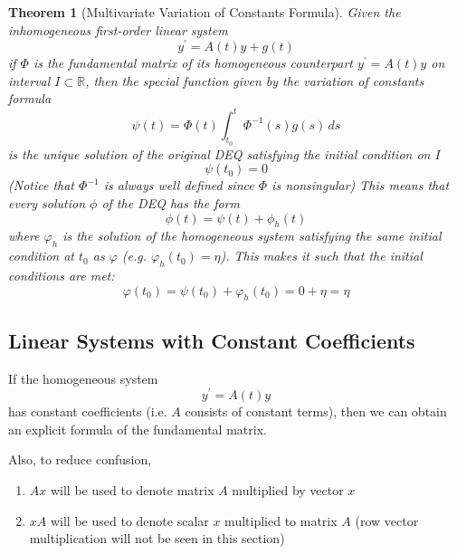 \documentclass{article}
\newtheorem{theorem}{Theorem}[section]
\theoremstyle{remark}
\theoremstyle{definition}
\begin{document}
      \begin{theorem}[Multivariate Variation of Constants Formula]
      Given the inhomogeneous first-order linear system 
      \[y^\prime = A(t) y + g(t)\]
      if $\Phi$ is the fundamental matrix of its homogeneous counterpart $y^\prime = A(t) y$ on interval $I \subset \mathbb{R}$, then the special function given by the variation of constants formula 
      \[\psi (t) = \Phi (t) \int_{t_0}^t \Phi^{-1} (s) g(s) \,ds\]
      is the unique solution of the original DEQ satisfying the initial condition on $I$
      \[\psi (t_0) = 0\]
      (Notice that $\Phi^{-1}$ is always well defined since $\Phi$ is nonsingular) This means that every solution $\phi$ of the DEQ has the form 
      \[\phi(t) = \psi (t) + \phi_h (t)\]
      where $\varphi_h$ is the solution of the homogeneous system satisfying the same initial condition at $t_0$ as $\varphi$ (e.g. $\varphi_h (t_0) = \eta$). This makes it such that the initial conditions are met: 
      \[\varphi(t_0) = \psi(t_0) + \varphi_h (t_0) = 0 + \eta = \eta\]
      \end{theorem}

  \subsection{Linear Systems with Constant Coefficients}

    If the homogeneous system 
    \[y^\prime = A(t) y\]
    has constant coefficients (i.e. $A$ consists of constant terms), then we can obtain an explicit formula of the fundamental matrix. 

    Also, to reduce confusion, 
    \begin{enumerate}
        \item $Ax$ will be used to denote matrix $A$ multiplied by vector $x$
        \item $xA$ will be used to denote scalar $x$ multiplied to matrix $A$ (row vector multiplication will not be seen in this section)
    \end{enumerate}
\end{document}
